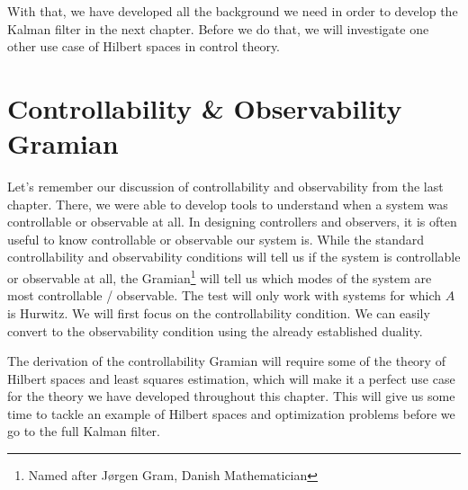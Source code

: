 With that, we have developed all the background we need in order to develop the Kalman filter in the next chapter. Before we do that, we will investigate one other use case of Hilbert spaces in control theory.

\section{Controllability \& Observability Gramian}
Let's remember our discussion of controllability and observability from the last chapter. There, we were able to develop tools to understand when a system was controllable or observable at all. 
In designing controllers and observers, it is often useful to know controllable or observable our system is. While the standard controllability and observability conditions will tell us if the system is controllable or observable at all, the Gramian\footnote{Named after J{\o}rgen Gram, Danish Mathematician} will tell us which modes of the system are most controllable / observable. The test will only work with systems for which $A$ is Hurwitz. We will first focus on the controllability condition. We can easily convert to the observability condition using the already established duality.

The derivation of the controllability Gramian will require some of the theory of Hilbert spaces and least squares estimation, which will make it a perfect use case for the theory we have developed throughout this chapter. This will give us some time to tackle an example of Hilbert spaces and optimization problems before we go to the full Kalman filter.

